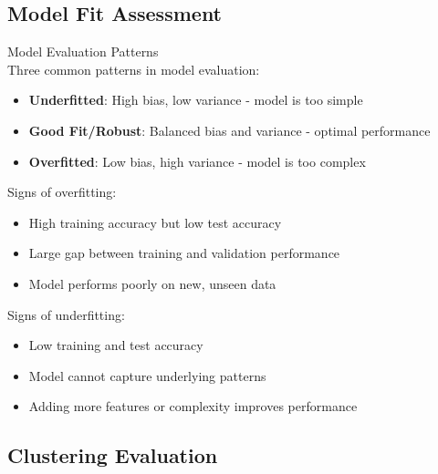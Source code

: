 \subsection{Model Fit Assessment}

\begin{concept}{Model Evaluation Patterns}\\
Three common patterns in model evaluation:
\begin{itemize}
    \item \textbf{Underfitted}: High bias, low variance - model is too simple
    \item \textbf{Good Fit/Robust}: Balanced bias and variance - optimal performance
    \item \textbf{Overfitted}: Low bias, high variance - model is too complex
\end{itemize}

Signs of overfitting:
\begin{itemize}
    \item High training accuracy but low test accuracy
    \item Large gap between training and validation performance
    \item Model performs poorly on new, unseen data
\end{itemize}

Signs of underfitting:
\begin{itemize}
    \item Low training and test accuracy
    \item Model cannot capture underlying patterns
    \item Adding more features or complexity improves performance
\end{itemize}
\end{concept}


\subsection{Clustering Evaluation}

